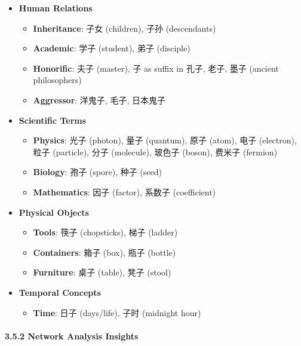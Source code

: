 \documentclass[
  11pt,
  letterpaper,
]{article}
\providecommand{\tightlist}{%
  \setlength{\itemsep}{0pt}\setlength{\parskip}{0pt}}
\begin{document}
\begin{itemize}
\tightlist
\item
  \textbf{Human Relations}

  \begin{itemize}
  \item
    \textbf{Inheritance}: 子女 (children), 子孙 (descendants)
  \item
    \textbf{Academic}: 学子 (student), 弟子 (disciple)
  \item
    \textbf{Honorific}: 夫子 (master), 子 as suffix in 孔子, 老子, 墨子
    (ancient philosophers)
  \item
    \textbf{Aggressor}: 洋鬼子, 毛子, 日本鬼子
  \end{itemize}
\item
  \textbf{Scientific Terms}

  \begin{itemize}
  \item
    \textbf{Physics}: 光子 (photon), 量子 (quantum), 原子 (atom), 电子
    (electron), 粒子 (particle), 分子 (molecule), 玻色子 (boson), 费米子
    (fermion)
  \item
    \textbf{Biology}: 孢子 (spore), 种子 (seed)
  \item
    \textbf{Mathematics}: 因子 (factor), 系数子 (coefficient)
  \end{itemize}
\item
  \textbf{Physical Objects}

  \begin{itemize}
  \item
    \textbf{Tools}: 筷子 (chopsticks), 梯子 (ladder)
  \item
    \textbf{Containers}: 箱子 (box), 瓶子 (bottle)
  \item
    \textbf{Furniture}: 桌子 (table), 凳子 (stool)
  \end{itemize}
\item
  \textbf{Temporal Concepts}

  \begin{itemize}
  \tightlist
  \item
    \textbf{Time}: 日子 (days/life), 子时 (midnight hour)
  \end{itemize}
\end{itemize}

\paragraph{3.5.2 Network Analysis
Insights}\label{network-analysis-insights}
\end{document}
